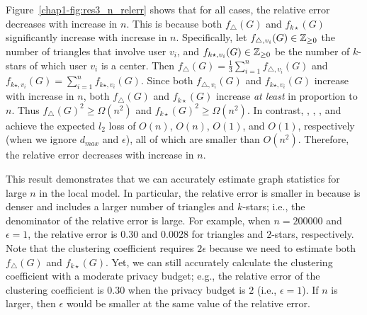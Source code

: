 Figure~\ref{chap1-fig:res3_n_relerr} shows that for all cases, the relative error decreases with increase in $n$. 
This is because both $f_\triangle(G)$ and $f_{k\star}(G)$ significantly increase with increase in $n$. 
Specifically, let $f_{\triangle,v_i}(G) \in \mathbb{Z}_{\ge0}$ the number of triangles that involve user $v_i$, and $f_{k\star,v_i}(G) \in \mathbb{Z}_{\ge0}$ be the number of $k$-stars of which user $v_i$ is a center. 
Then $f_\triangle(G) = \frac{1}{3}\sum_{i=1}^n f_{\triangle,v_i}(G)$ and $f_{k\star,v_i}(G) = \sum_{i=1}^n f_{k\star,v_i}(G)$. 
Since both $f_{\triangle,v_i}(G)$ and $f_{k\star,v_i}(G)$ increase with increase in $n$, both $f_\triangle(G)$ and $f_{k\star}(G)$ increase \textit{at least} in proportion to $n$. 
Thus $f_\triangle(G)^2 \geq \Omega(n^2)$ and $f_{k\star}(G)^2 \geq \Omega(n^2)$. 
In contrast, , , , and  achieve the expected $l_2$ loss of $O(n)$, $O(n)$, $O(1)$, and $O(1)$, respectively (when we ignore $d_{max}$ and $\epsilon$), all of which are smaller than $O(n^2)$. 
Therefore, the relative error decreases with increase in $n$. 

This result demonstrates that we can accurately estimate graph statistics for large $n$ in the local model. 
In particular, the relative error is smaller in \IMDB{} 
because \IMDB{} is denser and includes a larger number of triangles and $k$-stars; i.e., the denominator of the relative error is large. 
For example, when $n=200000$ and $\epsilon=1$, the relative error is 
$0.30$ and 
$0.0028$ 
for triangles and $2$-stars, 
respectively. 
Note that the clustering coefficient requires $2\epsilon$ 
because we need to estimate both $f_\triangle(G)$ and $f_{k\star}(G)$. 
Yet, we can still accurately calculate the clustering coefficient with a moderate privacy budget; 
e.g., the relative error of the clustering coefficient is 
$0.30$ 
when the privacy budget is $2$ (i.e., $\epsilon = 1$).
If $n$ is larger, then $\epsilon$ would be smaller at the same value of the relative error. 

